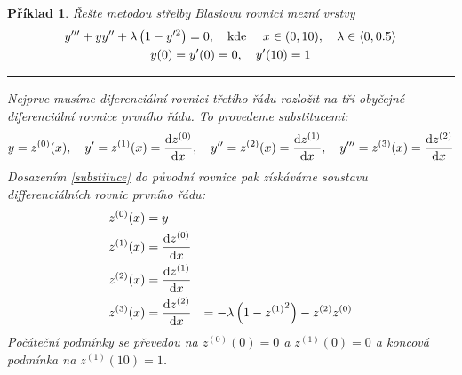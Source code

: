 \documentclass{article}
\newtheorem{example}{Příklad}
\begin{document}
\setcounter{example}{27}
\begin{example}
    Řešte metodou střelby Blasiovu rovnici mezní vrstvy
    \begin{gather*}
        y''' + y y'' + \lambda \left( 1 - y'^{2} \right)  = 0,
        \qq{kde } x \in (0,10) \qcomma \lambda \in \langle 0, 0.5 \rangle \\
        y(0) = y'(0) = 0 \qcomma y'(10) = 1
    \end{gather*}
    \smallskip
    \hrule
    \medskip
    Nejprve musíme diferenciální rovnici třetího řádu rozložit na tři obyčejné diferenciální rovnice prvního řádu. To provedeme substitucemi:
    \begin{equation}
        \label{substituce}
        y = z^{(0)}(x) \qcomma
        y' = z^{(1)}(x) = \dv{z^{(0)}}{x} \qcomma
        y'' = z^{(2)}(x) = \dv{z^{(1)}}{x} \qcomma
        y''' = z^{(3)}(x) = \dv{z^{(2)}}{x}
    \end{equation}
    Dosazením \ref{substituce} do původní rovnice pak získáváme soustavu differenciálních rovnic prvního řádu:
    \begin{equation}
        \begin{aligned}
           z^{(0)}(x) &= y \\
           z^{(1)}(x) &= \dv{z^{(0)}}{x} \\
           z^{(2)}(x) &= \dv{z^{(1)}}{x} \\
           z^{(3)}(x) &= \dv{z^{(2)}}{x}(x) &= -\lambda \left( 1 - {z^{(1)}}^{2} \right)  - z^{(2)}z^{(0)}
        \end{aligned}
    \end{equation}
    Počáteční podmínky se převedou na $z^{(0)}(0) = 0$ a $z^{(1)}(0) = 0$ a koncová podmínka na $z^{(1)}(10) = 1$.
    

\end{example}
\end{document}
